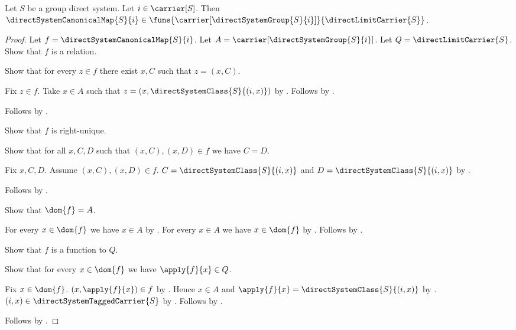 \begin{theorem}\label{direct_system_canonical_map_type}
    Let $S$ be a group direct system.
    Let $i\in\carrier[S]$.
    Then $\directSystemCanonicalMap{S}{i}\in
        \funs{\carrier[\directSystemGroup{S}{i}]}
            {\directLimitCarrier{S}}$.
\end{theorem}
\begin{proof}
    Let $f=\directSystemCanonicalMap{S}{i}$.
    Let $A=\carrier[\directSystemGroup{S}{i}]$.
    Let $Q=\directLimitCarrier{S}$.
    Show that $f$ is a relation.
    \begin{subproof}
        Show that for every $z\in f$ there exist $x,C$ such that
            $z=(x,C)$.
        \begin{subproof}
            Fix $z\in f$.
            Take $x\in A$ such that
                $z=(x,\directSystemClass{S}{(i,x)})$ by
                .
            Follows by \auto.
        \end{subproof}
        Follows by .
    \end{subproof}
    Show that $f$ is right-unique.
    \begin{subproof}
        Show that for all $x,C,D$ such that $(x,C),(x,D)\in f$
            we have $C=D$.
        \begin{subproof}
            Fix $x,C,D$.
            Assume $(x,C),(x,D)\in f$.
            $C=\directSystemClass{S}{(i,x)}$ and
                $D=\directSystemClass{S}{(i,x)}$ by
                .
        \end{subproof}
        Follows by .
    \end{subproof}
    Show that $\dom{f}=A$.
    \begin{subproof}
        For every $x\in\dom{f}$ we have $x\in A$ by
            .
        For every $x\in A$ we have $x\in\dom{f}$ by
            .
        Follows by .
    \end{subproof}
    Show that $f$ is a function to $Q$.
    \begin{subproof}
        Show that for every $x\in\dom{f}$ we have
            $\apply{f}{x}\in Q$.
        \begin{subproof}
            Fix $x\in\dom{f}$.
            $(x,\apply{f}{x})\in f$ by
                .
            Hence $x\in A$ and
                $\apply{f}{x}=\directSystemClass{S}{(i,x)}$ by
                .
            $(i,x)\in\directSystemTaggedCarrier{S}$ by
                .
            Follows by .
        \end{subproof}
    \end{subproof}
    Follows by .
\end{proof}

